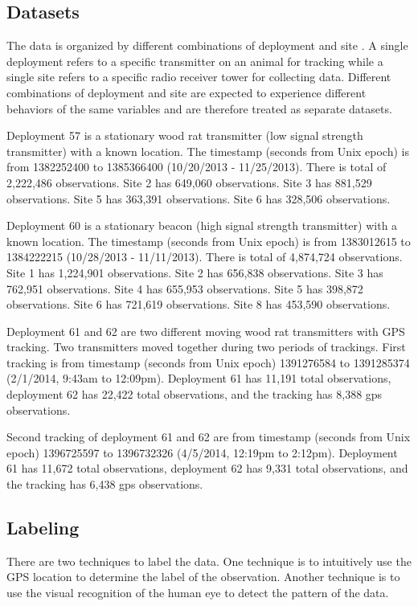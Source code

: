 \documentclass[twoside]{article}
\begin{document}
\subsection{Datasets}
The data is organized by different combinations of deployment and site . A single deployment refers to a specific transmitter on an animal for tracking while a single site refers to a specific radio receiver tower for collecting data. Different combinations of deployment and site are expected to experience different behaviors of the same variables and are therefore treated as separate datasets. 

\begin{compactitem}
\item Deployment 57 is a stationary wood rat transmitter (low signal strength transmitter) with a known location. The timestamp (seconds from Unix epoch) is from 1382252400 to 1385366400 (10/20/2013 - 11/25/2013). There is total of 2,222,486 observations. Site 2 has 649,060 observations. Site 3 has 881,529 observations. Site 5 has 363,391 observations. Site 6 has 328,506 observations.
\item Deployment 60 is a stationary beacon (high signal strength transmitter) with a known location. The timestamp  (seconds from Unix epoch) is from 1383012615 to 1384222215 (10/28/2013 - 11/11/2013). There is total of 4,874,724 observations. Site 1 has 1,224,901 observations. Site 2 has 656,838 observations. Site 3 has 762,951 observations. Site 4 has 655,953 observations. Site 5 has 398,872 observations. Site 6 has 721,619 observations. Site 8 has 453,590 observations.
\item Deployment 61 and 62 are two different moving wood rat transmitters with GPS tracking. Two transmitters moved together during two periods of trackings. First tracking is from timestamp  (seconds from Unix epoch) 1391276584 to 1391285374 (2/1/2014, 9:43am to 12:09pm). Deployment 61 has 11,191 total observations, deployment 62 has 22,422 total observations, and the tracking has 8,388 gps observations. 
\item Second tracking of deployment 61 and 62 are from timestamp  (seconds from Unix epoch) 1396725597 to 1396732326 (4/5/2014, 12:19pm to 2:12pm). Deployment 61 has 11,672 total observations, deployment 62 has 9,331 total observations, and the tracking has 6,438 gps observations.

\end{compactitem}

\subsection{Labeling}
There are two techniques to label the data. One technique is to intuitively use the GPS location to determine the label of the observation. Another technique is to use the visual recognition of the human eye to detect the pattern of the data.
\end{document}
